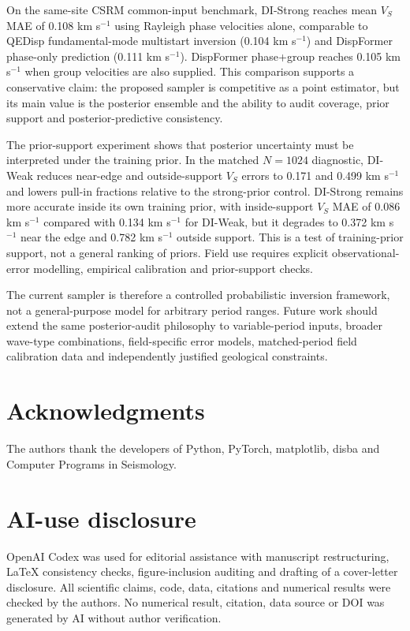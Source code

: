 \documentclass[referee]{gji}
\begin{document}
On the same-site CSRM common-input benchmark, DI-Strong reaches mean $V_S$ MAE of 0.108 km s$^{-1}$ using Rayleigh phase velocities alone, comparable to QEDisp fundamental-mode multistart inversion (0.104 km s$^{-1}$) and DispFormer phase-only prediction (0.111 km s$^{-1}$). DispFormer phase+group reaches 0.105 km s$^{-1}$ when group velocities are also supplied. This comparison supports a conservative claim: the proposed sampler is competitive as a point estimator, but its main value is the posterior ensemble and the ability to audit coverage, prior support and posterior-predictive consistency.

The prior-support experiment shows that posterior uncertainty must be interpreted under the training prior. In the matched $N=1024$ diagnostic, DI-Weak reduces near-edge and outside-support $V_S$ errors to 0.171 and 0.499 km s$^{-1}$ and lowers pull-in fractions relative to the strong-prior control. DI-Strong remains more accurate inside its own training prior, with inside-support $V_S$ MAE of 0.086 km s$^{-1}$ compared with 0.134 km s$^{-1}$ for DI-Weak, but it degrades to 0.372 km s$^{-1}$ near the edge and 0.782 km s$^{-1}$ outside support. This is a test of training-prior support, not a general ranking of priors. Field use requires explicit observational-error modelling, empirical calibration and prior-support checks.

The current sampler is therefore a controlled probabilistic inversion framework, not a general-purpose model for arbitrary period ranges. Future work should extend the same posterior-audit philosophy to variable-period inputs, broader wave-type combinations, field-specific error models, matched-period field calibration data and independently justified geological constraints.

\section*{Acknowledgments}

The authors thank the developers of Python, PyTorch, matplotlib, disba and Computer Programs in Seismology.

\section*{AI-use disclosure}

OpenAI Codex was used for editorial assistance with manuscript restructuring, LaTeX consistency checks, figure-inclusion auditing and drafting of a cover-letter disclosure. All scientific claims, code, data, citations and numerical results were checked by the authors. No numerical result, citation, data source or DOI was generated by AI without author verification.
\end{document}
